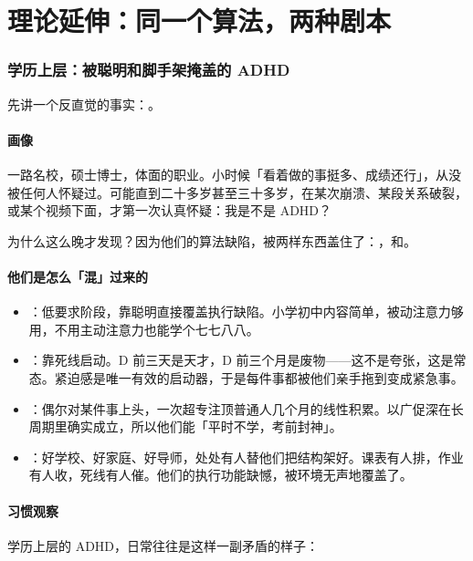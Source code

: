 \part{理论延伸：同一个算法，两种剧本}

\section{学历上层：被聪明和脚手架掩盖的 ADHD}

先讲一个反直觉的事实：。

\subsection{画像}

一路名校，硕士博士，体面的职业。小时候「看着做的事挺多、成绩还行」，从没被任何人怀疑过。可能直到二十多岁甚至三十多岁，在某次崩溃、某段关系破裂，或某个视频下面，才第一次认真怀疑：我是不是 ADHD？

为什么这么晚才发现？因为他们的算法缺陷，被两样东西盖住了：，和。

\subsection{他们是怎么「混」过来的}

\begin{itemize}
  \item {}：低要求阶段，靠聪明直接覆盖执行缺陷。小学初中内容简单，被动注意力够用，不用主动注意力也能学个七七八八。
  \item {}：靠死线启动。D 前三天是天才，D 前三个月是废物——这不是夸张，这是常态。紧迫感是唯一有效的启动器，于是每件事都被他们亲手拖到变成紧急事。
  \item {}：偶尔对某件事上头，一次超专注顶普通人几个月的线性积累。以广促深在长周期里确实成立，所以他们能「平时不学，考前封神」。
  \item {}：好学校、好家庭、好导师，处处有人替他们把结构架好。课表有人排，作业有人收，死线有人催。他们的执行功能缺憾，被环境无声地覆盖了。
\end{itemize}

\subsection{习惯观察}

学历上层的 ADHD，日常往往是这样一副矛盾的样子：


